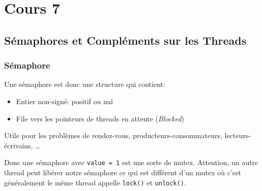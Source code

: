 \section{Cours 7}\label{cours-7}

\subsection{Sémaphores et Compléments sur les
Threads}\label{suxe9maphores-et-compluxe9ments-sur-les-threads}

\subsubsection{Sémaphore}\label{suxe9maphore}

Une sémaphore est donc une structure qui contient:

\begin{itemize}
\tightlist
\item
  Entier non-signé: positif ou nul
\item
  File vers les pointeurs de threads en attente (\emph{Blocked})
\end{itemize}

\begin{Shaded}
\begin{Highlighting}[]
\PreprocessorTok{ }
\OperatorTok{(}\OperatorTok{*}\OperatorTok{,} \OperatorTok{,}  \OperatorTok{);} 
\OperatorTok{(}\OperatorTok{*}\OperatorTok{);} 
\OperatorTok{(}\OperatorTok{*}\OperatorTok{);} 
\OperatorTok{(}\OperatorTok{*}\OperatorTok{);} 
\end{Highlighting}
\end{Shaded}

Utile pour les problèmes de rendez-vous, producteurs-consommateurs,
lecteurs-écrivains, \ldots{}

Donc une sémaphore avec \texttt{value\ =\ 1} est une sorte de mutex.
Attention, un autre thread peut libérer notre sémaphore ce qui est
différent d'un mutex où c'est généralement le même thread appelle
\texttt{lock()} et \texttt{unlock()}.

